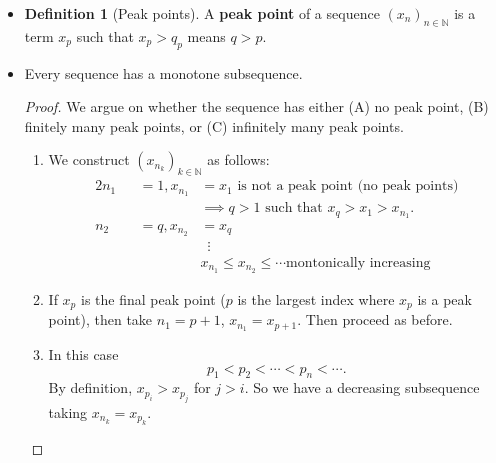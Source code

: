 \documentclass{article}
\newcommand{\N}{\mathbb{N}}
\newcommand{\seq}[2]{(#1_{#2})_{#2 \in \N}}
\newcommand{\?}{\stackrel{?}{=}}
\theoremstyle{definition} %
\newtheorem{definition}[theorem]{Definition} %
\begin{document}
\begin{itemize}
    \item[]
          \begin{definition}[Peak points]
              A \textbf{peak point} of a sequence $\seq{x}{n}$ is a term $x_p$ such that $x_p > q_p$ means $q > p$.
          \end{definition}
    \item[]
          \begin{lemma}
              Every sequence has a monotone subsequence.
          \end{lemma}
          \begin{proof}
              We argue on whether the sequence has either (A) no peak point, (B) finitely many peak points, or (C) infinitely many peak points.
              \begin{enumerate}[label=(\Alph*)]
                  \item We construct $(x_{n_k})_{k \in \N}$ as follows:
                        \begin{alignat*}{2}
                            n_1 &  & = 1, x_{n_1} & = x_1 \text{ is not a peak point (no peak points)}              \\
                                &  &              & \implies q>1 \text{ such that } x_q > x_1 > x_{n_1}.            \\
                            n_2 &  & = q, x_{n_2} & = x_q                                                           \\
                                &  &              & \hspace{6pt}\vdots                                              \\
                                &  &              & x_{n_1} \leq x_{n_2} \leq \cdots \text{montonically increasing}
                        \end{alignat*}
                  \item If $x_p$ is the final peak point ($p$ is the largest index where $x_p$ is a peak point), then take $n_1 = p + 1$, $x_{n_1} = x_{p + 1}$. Then proceed as before.
                  \item In this case
                        $$p_1 < p_2 < \cdots < p_n < \cdots.$$
                        By definition, $x_{p_i} > x_{p_j}$ for $j > i$. So we have a decreasing subsequence taking $x_{n_k} = x_{p_k}$.
              \end{enumerate}
          \end{proof}

\end{itemize}
\end{document}
